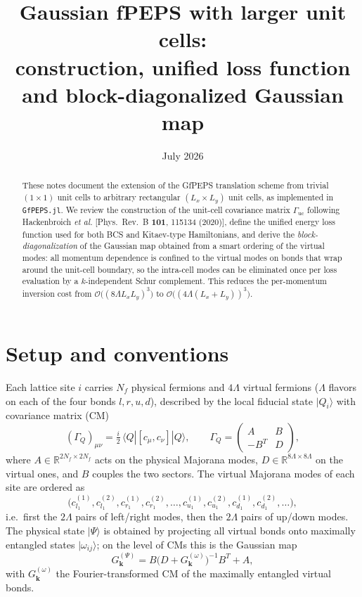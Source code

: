 \documentclass[11pt,a4paper]{article}
\title{Gaussian fPEPS with larger unit cells:\\
construction, unified loss function and block-diagonalized Gaussian map}
\date{July 2026}
\newcommand{\uc}{\mathrm{uc}}
\newcommand{\Guc}{\Gamma_{\uc}}
\begin{document}
\maketitle

\begin{abstract}
These notes document the extension of the GfPEPS translation scheme
from trivial $(1\times 1)$ unit cells to arbitrary
rectangular $(L_x \times L_y)$ unit cells, as implemented in
\texttt{GfPEPS.jl}. We review the construction of the unit-cell covariance
matrix $\Guc$ following Hackenbroich \emph{et al.}
[Phys.\ Rev.\ B \textbf{101}, 115134 (2020)], define the unified energy loss
function used for both BCS and Kitaev-type Hamiltonians, and derive the
\emph{block-diagonalization} of the Gaussian map obtained from a smart
ordering of the virtual modes: all momentum dependence is confined to the
virtual modes on bonds that wrap around the unit-cell boundary, so the
intra-cell modes can be eliminated once per loss evaluation by a
$k$-independent Schur complement. This reduces the per-momentum inversion
cost from $\mathcal{O}\!\big((8\Lambda L_x L_y)^3\big)$ to
$\mathcal{O}\!\big((4\Lambda (L_x{+}L_y))^3\big)$.
\end{abstract}

\section{Setup and conventions}

Each lattice site $i$ carries $N_f$ physical fermions and $4\Lambda$ virtual fermions
($\Lambda$ flavors on each of the four bonds $l,r,u,d$), described by the
local fiducial state $|Q_i\rangle$ with covariance matrix (CM)
\begin{equation}
  (\Gamma_Q)_{\mu\nu} = \tfrac{i}{2}\,
  \langle Q | [c_\mu, c_\nu] | Q \rangle ,
  \qquad
  \Gamma_Q =
  \begin{pmatrix} A & B \\ -B^{T} & D \end{pmatrix},
  \label{eq:GammaQ}
\end{equation}
where $A \in \mathbb{R}^{2N_f \times 2N_f}$ acts on the physical Majorana
modes, $D \in \mathbb{R}^{8\Lambda \times 8\Lambda}$ on the virtual ones,
and $B$ couples the two sectors. The virtual Majorana modes of each site are
ordered as
\begin{equation}
  \big(c^{(1)}_{l_1}, c^{(2)}_{l_1}, c^{(1)}_{r_1}, c^{(2)}_{r_1},
  \dots,
  c^{(1)}_{u_1}, c^{(2)}_{u_1}, c^{(1)}_{d_1}, c^{(2)}_{d_1}, \dots\big),
  \label{eq:siteordering}
\end{equation}
i.e.\ first the $2\Lambda$ pairs of left/right modes, then the $2\Lambda$
pairs of up/down modes. The physical state $|\Psi\rangle$ is obtained by
projecting all virtual bonds onto maximally entangled states
$|\omega_{ij}\rangle$; on the level of CMs this is the Gaussian map
\begin{equation}
  G^{(\Psi)}_{\bm k}
  = B \big( D + G^{(\omega)}_{\bm k} \big)^{-1} B^{T} + A ,
  \label{eq:gaussianmap}
\end{equation}
with $G^{(\omega)}_{\bm k}$ the Fourier-transformed CM of the maximally
entangled virtual bonds.
\end{document}
